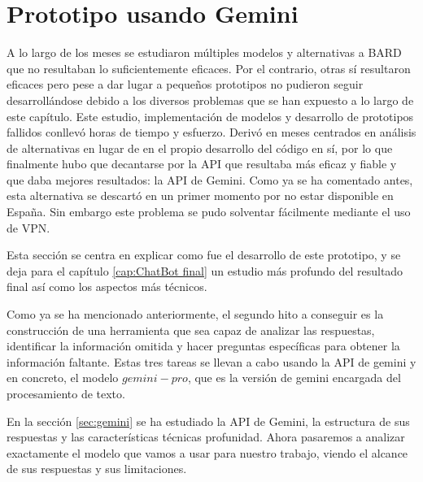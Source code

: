 \section{Prototipo usando Gemini}
\label{protogemini}
A lo largo de los meses se estudiaron múltiples modelos y alternativas a BARD que no resultaban lo suficientemente eficaces. Por el contrario, otras sí resultaron eficaces pero pese a dar lugar a pequeños prototipos no pudieron seguir desarrollándose debido a los diversos problemas que se han expuesto a lo largo de este capítulo. Este estudio, implementación de modelos y desarrollo de prototipos fallidos conllevó horas de tiempo y esfuerzo. Derivó en meses centrados en análisis de alternativas en lugar de en el propio desarrollo del código en sí, por lo que finalmente hubo que decantarse por la API que resultaba más eficaz y fiable y que daba mejores resultados: la API de Gemini. Como ya se ha comentado antes, esta alternativa se descartó en un primer momento por no estar disponible en España. Sin embargo este problema se pudo solventar fácilmente mediante el uso de VPN. 

Esta sección se centra en explicar como fue el desarrollo de este prototipo, y se deja para el capítulo \ref{cap:ChatBot final} un estudio más profundo del resultado final así como los aspectos más técnicos.

Como ya se ha mencionado anteriormente, el segundo hito a conseguir es la construcción de una herramienta que sea capaz de analizar las respuestas, identificar la información omitida y hacer preguntas específicas para obtener la información faltante. Estas tres tareas se llevan a cabo usando la API de gemini y en concreto, el modelo $gemini-pro$, que es la versión de gemini encargada del procesamiento de texto. 

En la sección \ref{sec:gemini} se ha estudiado la API de Gemini, la estructura de sus respuestas y las características técnicas profunidad. Ahora pasaremos a analizar exactamente el modelo que vamos a usar para nuestro trabajo, viendo el alcance de sus respuestas y sus limitaciones. 

